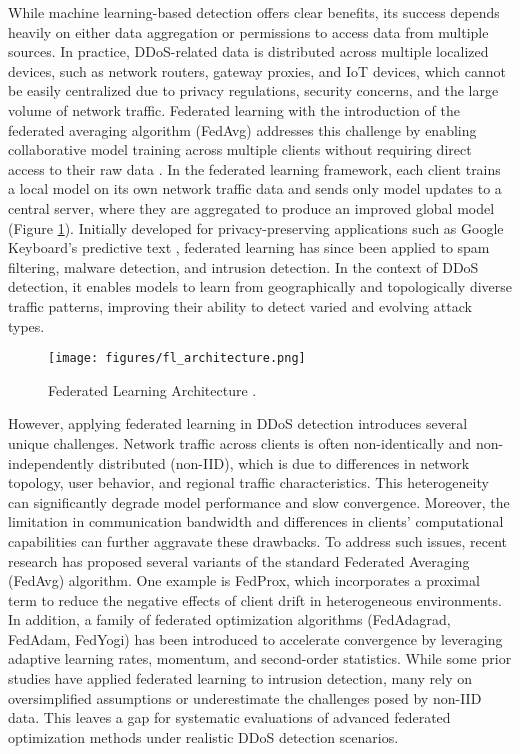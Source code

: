 While machine learning-based detection offers clear benefits, its success depends heavily on either data aggregation or permissions to access data from multiple sources. In practice, DDoS-related data is distributed across multiple localized devices, such as network routers, gateway proxies, and IoT devices, which cannot be easily centralized due to privacy regulations, security concerns, and the large volume of network traffic. Federated learning with the introduction of the federated averaging algorithm (FedAvg) addresses this challenge by enabling collaborative model training across multiple clients without requiring direct access to their raw data \citep{mcmahan2023communication}. In the federated learning framework, each client trains a local model on its own network traffic data and sends only model updates to a central server, where they are aggregated to produce an improved global model (Figure \ref{fig:fl_architecture}). Initially developed for privacy-preserving applications such as Google Keyboard’s predictive text \citep{47586}, federated learning has since been applied to spam filtering, malware detection, and intrusion detection. In the context of DDoS detection, it enables models to learn from geographically and topologically diverse traffic patterns, improving their ability to detect varied and evolving attack types.

\begin{figure}[h]
    \centering
    \texttt{[image: figures/fl\_architecture.png]}
    \caption{Federated Learning Architecture \citep{gfg-fl-architecture}.}
    \label{fig:fl_architecture}
\end{figure}

However, applying federated learning in DDoS detection introduces several unique challenges. Network traffic across clients is often non-identically and non-independently distributed (non-IID), which is due to differences in network topology, user behavior, and regional traffic characteristics. This heterogeneity can significantly degrade model performance and slow convergence. Moreover, the limitation in communication bandwidth and differences in clients' computational capabilities can further aggravate these drawbacks. To address such issues, recent research has proposed several variants of the standard Federated Averaging (FedAvg) algorithm. One example is FedProx, which incorporates a proximal term to reduce the negative effects of client drift in heterogeneous environments. In addition, a family of federated optimization algorithms (FedAdagrad, FedAdam, FedYogi) has been introduced to accelerate convergence by leveraging adaptive learning rates, momentum, and second-order statistics. While some prior studies have applied federated learning to intrusion detection, many rely on oversimplified assumptions or underestimate the challenges posed by non-IID data. This leaves a gap for systematic evaluations of advanced federated optimization methods under realistic DDoS detection scenarios.

